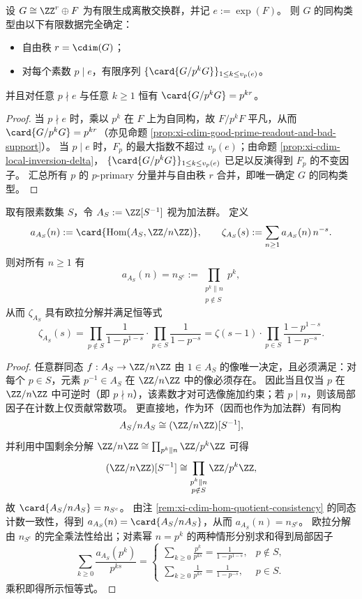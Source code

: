 \begin{proposition}[有限局部数据的充分性]\label{prop:xi-cdim-finite-data-suffices}
设 \(G\cong \ZZ^{r}\oplus F\) 为有限生成离散交换群，并记 \(e:=\exp(F)\)。
则 \(G\) 的同构类型由以下有限数据完全确定：
\begin{itemize}
  \item 自由秩 \(r=\cdim(G)\)；
  \item 对每个素数 \(p\mid e\)，有限序列 \(\{\card{G/p^kG}\}_{1\le k\le v_p(e)}\)。
\end{itemize}
并且对任意 \(p\nmid e\) 与任意 \(k\ge 1\) 恒有 \(\card{G/p^kG}=p^{kr}\)。
\end{proposition}
\begin{proof}
当 \(p\nmid e\) 时，乘以 \(p^k\) 在 \(F\) 上为自同构，故 \(F/p^kF\) 平凡，从而
\(\card{G/p^kG}=p^{kr}\)（亦见命题 \ref{prop:xi-cdim-good-prime-readout-and-bad-support}）。
当 \(p\mid e\) 时，\(F_p\) 的最大指数不超过 \(v_p(e)\)；由命题 \ref{prop:xi-cdim-local-inversion-delta}，
\(\{\card{G/p^kG}\}_{1\le k\le v_p(e)}\) 已足以反演得到 \(F_p\) 的不变因子。
汇总所有 \(p\) 的 \(p\)-primary 分量并与自由秩 \(r\) 合并，即唯一确定 \(G\) 的同构类型。
\end{proof}

\begin{theorem}\label{thm:xi-cdim-localization-zeta-AS}
取有限素数集 \(S\)，令 \(A_S:=\ZZ[S^{-1}]\) 视为加法群。
定义
\[
a_{A_S}(n):=\card{\operatorname{Hom}(A_S,\ZZ/n\ZZ)},\qquad
\zeta_{A_S}(s):=\sum_{n\ge 1}a_{A_S}(n)\,n^{-s}.
\]
则对所有 \(n\ge 1\) 有
\[
a_{A_S}(n)=n_{S^c}:=\prod_{\substack{p^k\parallel n\\ p\notin S}}p^k,
\]
从而 \(\zeta_{A_S}\) 具有欧拉分解并满足恒等式
\[
\zeta_{A_S}(s)
=\prod_{p\notin S}\frac{1}{1-p^{1-s}}\cdot\prod_{p\in S}\frac{1}{1-p^{-s}}
=\zeta(s-1)\cdot\prod_{p\in S}\frac{1-p^{1-s}}{1-p^{-s}}.
\]
\end{theorem}
\begin{proof}
任意群同态 \(f:A_S\to \ZZ/n\ZZ\) 由 \(1\in A_S\) 的像唯一决定，且必须满足：对每个 \(p\in S\)，元素 \(p^{-1}\in A_S\) 在 \(\ZZ/n\ZZ\) 中的像必须存在。
因此当且仅当 \(p\) 在 \(\ZZ/n\ZZ\) 中可逆时（即 \(p\nmid n\)），该素数才对可选像施加约束；若 \(p\mid n\)，则该局部因子在计数上仅贡献常数项。
更直接地，作为环（因而也作为加法群）有同构
\[
A_S/nA_S\cong (\ZZ/n\ZZ)[S^{-1}],
\]
并利用中国剩余分解
\(
\ZZ/n\ZZ\cong \prod_{p^k\parallel n}\ZZ/p^k\ZZ
\)
可得
\[
(\ZZ/n\ZZ)[S^{-1}]\cong \prod_{\substack{p^k\parallel n\\ p\notin S}}\ZZ/p^k\ZZ,
\]
故
\(
\card{A_S/nA_S}=n_{S^c}
\)。
由注 \ref{rem:xi-cdim-hom-quotient-consistency} 的同态计数一致性，得到 \(a_{A_S}(n)=\card{A_S/nA_S}\)，从而 \(a_{A_S}(n)=n_{S^c}\)。
欧拉分解由 \(n_{S^c}\) 的完全乘法性给出；对素幂 \(n=p^k\) 的两种情形分别求和得到局部因子
\[
\sum_{k\ge 0}\frac{a_{A_S}(p^k)}{p^{ks}}
=
\begin{cases}
\sum_{k\ge 0}\frac{p^k}{p^{ks}}=\frac{1}{1-p^{1-s}},& p\notin S,\\[6pt]
\sum_{k\ge 0}\frac{1}{p^{ks}}=\frac{1}{1-p^{-s}},& p\in S.
\end{cases}
\]
乘积即得所示恒等式。
\end{proof}

